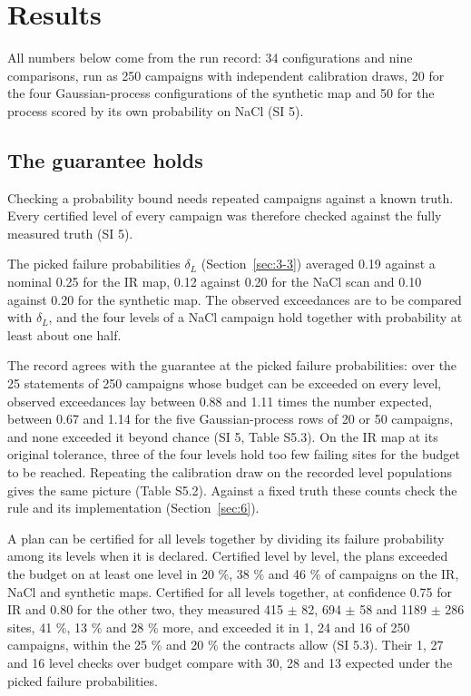 \documentclass{iopjournal}
\begin{document}
\hypertarget{sec:5}{%
\section{Results}\label{sec:5}}

All numbers below come from the run record: 34 configurations and nine comparisons, run as 250 campaigns with independent calibration draws, 20 for the four Gaussian-process configurations of the synthetic map and 50 for the process scored by its own probability on NaCl (SI 5).

\hypertarget{sec:5-1}{%
\subsection{The guarantee holds}\label{sec:5-1}}

Checking a probability bound needs repeated campaigns against a known truth. Every certified level of every campaign was therefore checked against the fully measured truth (SI 5).

The picked failure probabilities \(\delta_L\) (Section~\ref{sec:3-3}) averaged 0.19 against a nominal 0.25 for the IR map, 0.12 against 0.20 for the NaCl scan and 0.10 against 0.20 for the synthetic map. The observed exceedances are to be compared with \(\delta_L\), and the four levels of a NaCl campaign hold together with probability at least about one half.

The record agrees with the guarantee at the picked failure probabilities: over the 25 statements of 250 campaigns whose budget can be exceeded on every level, observed exceedances lay between 0.88 and 1.11 times the number expected, between 0.67 and 1.14 for the five Gaussian-process rows of 20 or 50 campaigns, and none exceeded it beyond chance (SI 5, Table S5.3). On the IR map at its original tolerance, three of the four levels hold too few failing sites for the budget to be reached. Repeating the calibration draw on the recorded level populations gives the same picture (Table S5.2). Against a fixed truth these counts check the rule and its implementation (Section~\ref{sec:6}).

A plan can be certified for all levels together by dividing its failure probability among its levels when it is declared. Certified level by level, the plans exceeded the budget on at least one level in 20 \%, 38 \% and 46 \% of campaigns on the IR, NaCl and synthetic maps. Certified for all levels together, at confidence 0.75 for IR and 0.80 for the other two, they measured 415 \ensuremath{\pm} 82, 694 \ensuremath{\pm} 58 and 1189 \ensuremath{\pm} 286 sites, 41 \%, 13 \% and 28 \% more, and exceeded it in 1, 24 and 16 of 250 campaigns, within the 25 \% and 20 \% the contracts allow (SI 5.3). Their 1, 27 and 16 level checks over budget compare with 30, 28 and 13 expected under the picked failure probabilities.
\end{document}
